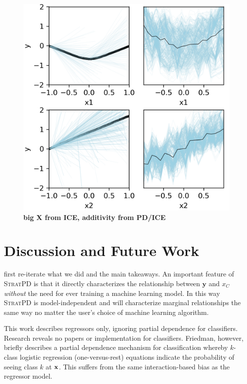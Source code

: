 \documentclass[12pt]{article}
\newcommand{\spd}{\fontfamily{cmr}\textsc{\small StratPD}}
\begin{document}
\begin{figure}[htbp]
\begin{center}
\includegraphics[scale=0.7]{images/additivity.png}
\caption{{\bf big X from ICE, additivity from PD/ICE}}
\label{fig:bigx_y_stratpd}
\end{center}
\end{figure}

\section{Discussion and Future Work}

{\color{red} first re-iterate what we did and the main takeaways}. An important feature of \spd{} is that it directly characterizes the relationship between $\mathbf{y}$ and $x_C$ \emph{without} the need for ever training a machine learning model. In this way \spd{} is {model-independent} and will characterize marginal relationships the same way no matter the user's choice of machine learning algorithm. 

This work describes regressors only, ignoring partial dependence for classifiers.  Research reveals no papers or implementation for classifiers. Friedman, however, briefly describes a partial dependence mechanism for classification whereby $k$-class logistic regression (one-versus-rest) equations indicate the probability of seeing class $k$ at $\bf{x}$.  This suffers from the same interaction-based bias as the regressor model.
\end{document}
